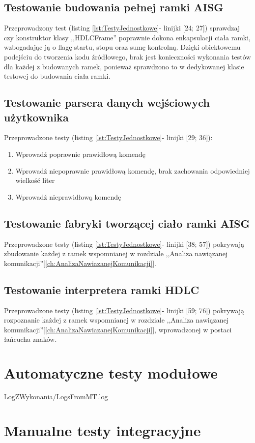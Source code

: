         \subsection{Testowanie budowania pełnej ramki AISG}
            Przeprowadzony test (listing \ref{lst:TestyJednostkowe}- linijki [24; 27]) sprawdzaj czy konstruktor klasy ,,HDLCFrame'' poprawnie
            dokona enkapsulacji ciała ramki, wzbogadając ją o flagę startu, stopu oraz sumę kontrolną. Dzięki obiektowemu podejściu do tworzenia kodu źródłowego, 
            brak jest konieczności wykonania testów dla każdej z budowanych ramek, ponieważ sprawdzono to w dedykowanej klasie testowej do budowania ciała ramki. 
        \subsection{Testowanie parsera danych wejściowych użytkownika}
            Przeprowadzone testy (listing \ref{lst:TestyJednostkowe}- linijki [29; 36]):
            \begin{enumerate}
                \item Wprowadź poprawnie prawidłową komendę
                \item Wprowadź niepoprawnie prawidłową komendę, brak zachowania odpowiedniej wielkość liter
                \item Wprowadź nieprawidłową komendę
            \end{enumerate}
        \subsection{Testowanie fabryki tworzącej ciało ramki AISG}
            Przeprowadzone testy (listing \ref{lst:TestyJednostkowe}- linijki [38; 57]) pokrywają zbudowanie każdej z ramek
            wspomnianej w rozdziale ,,Analiza nawiązanej komunikacji''[\ref{ch:AnalizaNawiazanejKomunikacji}].
        \subsection{Testowanie interpretera ramki HDLC}
            Przeprowadzone testy (listing \ref{lst:TestyJednostkowe}- linijki [59; 76]) pokrywają rozpoznanie każdej z ramek 
            wspomnianej w rozdziale ,,Analiza nawiązanej komunikacji''[\ref{ch:AnalizaNawiazanejKomunikacji}], wprowadzonej w postaci łańcucha znaków.
    \section{Automatyczne testy modułowe}
        
        {LogZWykonania/LogsFromMT.log}
    \section{Manualne testy integracyjne}
